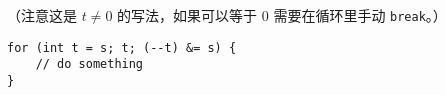 （注意这是 $t\ne 0$ 的写法，如果可以等于 $0$ 需要在循环里手动 \texttt{break}。）
\begin{verbatim}
for (int t = s; t; (--t) &= s) {
    // do something
}
\end{verbatim}
